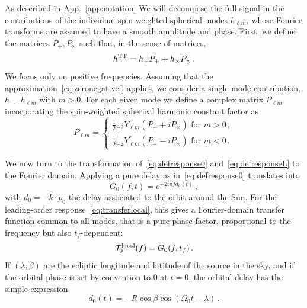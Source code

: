 \documentclass[aps,showpacs,twocolumn,prd,superscriptaddress,nofootinbib]{revtex4-1}
\newcommand{\be}{\begin{equation}}
\newcommand{\ee}{\end{equation}}
\newcommand\calT{{\mathcal{T}}}
\newcommand{\hatk}{\hat{k}}
\newcommand{\tf}{t_{f}}
\begin{document}
As described in App.~\ref{app:notation} We will decompose the full signal in the contributions of the individual spin-weighted spherical modes $h_{\ell m}$, whose Fourier transforms are assumed to have a smooth amplitude and phase. First, we define the matrices $P_{+},P_{\times}$ such that, in the sense of matrices,
\be
	h^{\rm TT} = h_{+}P_{+} + h_{\times}P_{\times} \,.
\ee
We focus only on positive frequencies. Assuming that the approximation~\eqref{eq:zeronegativef} applies, we consider a single mode contribution, $h=h_{\ell m}$ with $m>0$. For each given mode we define a complex matrix $P_{\ell m}$ incorporating the spin-weighted spherical harmonic constant factor as
\be
	P_{\ell m} =
	\begin{cases}
	\frac{1}{2} {}_{-2}Y_{\ell m} \left( P_{+} + i P_{\times} \right) \text{ for } m>0\,,\\
	\frac{1}{2} {}_{-2}Y_{\ell m}^{*} \left( P_{+} - i P_{\times} \right) \text{ for } m<0\,.
	\end{cases}
\ee

We now turn to the transformation of~\eqref{eq:defresponse0} and~\eqref{eq:defresponseL} to the Fourier domain. Applying a pure delay as in~\eqref{eq:defresponse0} translates into
\be\label{eq:G0}
	G_{0}(f, t) = e^{-2i\pi f d_{0}(t)} \,,
\ee
with $d_{0} = -\hatk \cdot p_{0}$ the delay associated to the orbit around the Sun. For the leading-order response~\eqref{eq:transferlocal}, this gives a Fourier-domain transfer function common to all modes, that is a pure phase factor, proportional to the frequency but also $t_{f}$-dependent:
\be\label{eq:transfer0local}
	\calT_{0}^{\rm local}(f) = G_{0}(f, \tf)\,.
\ee
If $(\lambda, \beta)$ are the ecliptic longitude and latitude of the source in the sky, and if the orbital phase is set by convention to $0$ at $t=0$, the orbital delay has the simple expression
\be\label{eq:delay0}
	d_{0}(t) = -R \cos\beta \cos\left(\Omega_{0}t - \lambda\right)\,.
\ee
\end{document}
